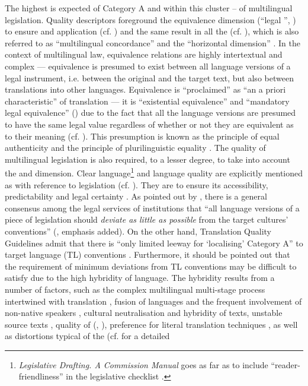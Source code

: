 \documentclass[output=paper]{langsci/langscibook}
\begin{document}
The highest  is expected of Category A and within this  cluster – of multilingual legislation. Quality descriptors foreground the equivalence dimension (“legal '', \citealt[6]{DGT2016b}) to ensure  and application (cf. \citealt[72]{Šarčević1997}) and the same result in all the  (cf. \citealt[1191]{Pozzo2012b}), which is also referred to as “multilingual concordance'' \citep[4]{DGT2016b} and the “horizontal dimension'' \citep[44]{Robertson2015}. In the context of multilingual law, equivalence relations are highly intertextual and complex — equivalence is presumed to exist between all language versions of a legal instrument, i.e. between the original and the target text, but also between translations into other languages. Equivalence is “proclaimed'' \citep[11]{Hermans2007} as “an a priori characteristic'' of  translation \citep[49]{Koskinen2000} — it is “existential equivalence'' \citep[51]{Koskinen2000} and “mandatory legal equivalence'' (\citealt[180–181]{Tosi2002}) due to the fact that all the language versions are presumed to have the same legal value regardless of whether or not they are equivalent as to their meaning (cf. \citealt[180]{Tosi2002}). This presumption is known as the principle of equal authenticity \citep[64]{Šarčević1997} and the principle of plurilinguistic equality \citep{vanEls2001}. The quality of multilingual legislation is also required, to a lesser degree, to take into account the  and  dimension. Clear language\footnote{\textit{Legislative Drafting. A Commission Manual} goes as far as to include ``reader-friendliness'' in the legislative checklist \citep[78]{EuropeanCommission1997}.} and language quality are explicitly mentioned as  with reference to legislation (cf. \citealt[6]{DGT2016b}). They are to ensure its accessibility, predictability and legal certainty \citep[146]{Strandvik2015}. As pointed out by \citeauthor{Strandvik2015}, there is a general consensus among the legal services of  institutions that “all language versions of a piece of legislation should \textit{deviate as little as possible} from the target cultures’  conventions” (\citeyear[153]{Strandvik2015}, emphasis added). On the other hand,  Translation Quality Guidelines admit that there is “only limited leeway for ‘localising’ Category A” to target language (TL) conventions \citep[14]{DGT2016b}. Furthermore, it should be pointed out that the requirement of minimum deviations from TL conventions may be difficult to satisfy due to the high hybridity of  language. The hybridity results from a number of factors, such as the complex multilingual multi-stage  process intertwined with translation \citep[360]{Doczekalska2009paradoxes}, fusion of languages and the frequent involvement of non-native speakers \citep[76]{WagnerEtAl2002}, cultural neutralisation and hybridity of texts, unstable source texts \citep{Stefaniak2013}, quality of  (\citealt[184]{Tosi2002}, \citealt[22]{Šarčević2013}), preference for literal translation techniques \citep[54]{Koskinen2000}, as well as distortions typical of the  (cf. \citealt{Biel2014} for a detailed 
\end{document}
